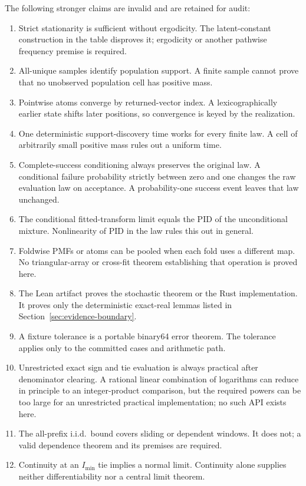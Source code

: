 \documentclass[11pt]{article}
\theoremstyle{definition}
\newcommand{\imin}{I_{\min}}
\begin{document}
	The following stronger claims are invalid and are retained for audit:
	\begin{enumerate}
	  \item Strict stationarity is sufficient without ergodicity.  The latent-constant construction
	    in the table disproves it; ergodicity or another pathwise frequency premise is required.
	  \item All-unique samples identify population support.  A finite sample cannot prove that no
	    unobserved population cell has positive mass.
	  \item Pointwise atoms converge by returned-vector index.  A lexicographically earlier state
	    shifts later positions, so convergence is keyed by the realization.
	  \item One deterministic support-discovery time works for every finite law.  A cell of
	    arbitrarily small positive mass rules out a uniform time.
	  \item Complete-success conditioning always preserves the original law. A conditional failure probability strictly between zero and one changes the raw evaluation law on acceptance. A probability-one success event leaves that law unchanged.
	  \item The conditional fitted-transform limit equals the PID of the unconditional mixture.
	    Nonlinearity of PID in the law rules this out in general.
	  \item Foldwise PMFs or atoms can be pooled when each fold uses a different map.  No
	    triangular-array or cross-fit theorem establishing that operation is proved here.
	  \item The Lean artifact proves the stochastic theorem or the Rust implementation.  It proves
	    only the deterministic exact-real lemmas listed in Section~\ref{sec:evidence-boundary}.
	  \item A fixture tolerance is a portable binary64 error theorem.  The tolerance applies only to
	    the committed cases and arithmetic path.
	  \item Unrestricted exact sign and tie evaluation is always practical after denominator
	    clearing.  A rational linear combination of logarithms can reduce in principle to an
	    integer-product comparison, but the required powers can be too large for an unrestricted
	    practical implementation; no such API exists here.
	  \item The all-prefix i.i.d.\ bound covers sliding or dependent windows.  It does not; a valid
	    dependence theorem and its premises are required.
	  \item Continuity at an $\imin$ tie implies a normal limit.  Continuity alone supplies neither
	    differentiability nor a central limit theorem.
	\end{enumerate}
\end{document}
